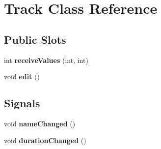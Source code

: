 \hypertarget{class_track}{\section{\-Track \-Class \-Reference}
\label{class_track}
}
\subsection*{\-Public \-Slots}
\begin{DoxyCompactItemize}
\item 
\hypertarget{class_track_a278781943f612432554c3ca2d00cc91b}{int {\bfseries receive\-Values} (int, int)}\label{class_track_a278781943f612432554c3ca2d00cc91b}

\item 
\hypertarget{class_track_a4f3866ef5530386df5a0edddd952855c}{void {\bfseries edit} ()}\label{class_track_a4f3866ef5530386df5a0edddd952855c}

\end{DoxyCompactItemize}
\subsection*{\-Signals}
\begin{DoxyCompactItemize}
\item 
\hypertarget{class_track_a97e632553490ba9a006f786d5fef787d}{void {\bfseries name\-Changed} ()}\label{class_track_a97e632553490ba9a006f786d5fef787d}

\item 
\hypertarget{class_track_a15abbcbe88a1f96179f1d96d8d4444f3}{void {\bfseries duration\-Changed} ()}\label{class_track_a15abbcbe88a1f96179f1d96d8d4444f3}

\end{DoxyCompactItemize}
